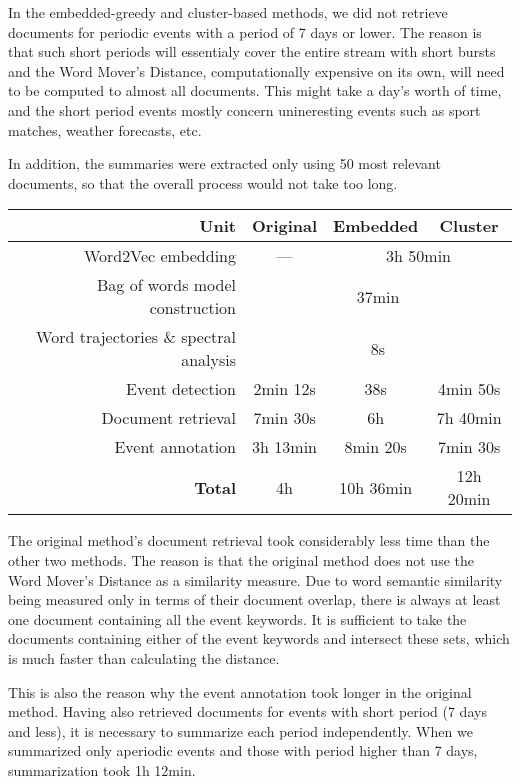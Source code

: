 In the embedded-greedy and cluster-based methods, we did not retrieve documents for periodic events with a period of 7 days or lower. The reason is that such short periods will essentialy cover the entire stream with short bursts and the Word Mover's Distance, computationally expensive on its own, will need to be computed to almost all documents. This might take a day's worth of time, and the short period events mostly concern unineresting events such as sport matches, weather forecasts, etc.

In addition, the summaries were extracted only using 50 most relevant documents, so that the overall process would not take too long.

\hspace{\fill}

\begin{minipage}{\linewidth}
\centering
\begin{tabular}{ r c c c }\toprule[1.5pt]
\bf Unit & \bf Original & \bf Embedded & \bf Cluster \\ \midrule
Word2Vec embedding & --- & \multicolumn{2}{c}{3h 50min} \\
Bag of words model construction & \multicolumn{3}{c}{37min} \\
Word trajectories \& spectral analysis & \multicolumn{3}{c}{8s} \\
Event detection & 2min 12s & 38s & 4min 50s \\
Document retrieval & 7min 30s & 6h & 7h 40min \\
Event annotation & 3h 13min & 8min 20s & 7min 30s \\ \midrule
\bf Total & 4h & 10h 36min & 12h 20min\\ \bottomrule[1.25pt]

\end{tabular}\par
{} \label{tab:title}
\end{minipage}

\hspace{\fill}

The original method's document retrieval took considerably less time than the other two methods. The reason is that the original method does not use the Word Mover's Distance as a similarity measure. Due to word semantic similarity being measured only in terms of their document overlap, there is always at least one document containing all the event keywords. It is sufficient to take the documents containing either of the event keywords and intersect these sets, which is much faster than calculating the distance.

This is also the reason why the event annotation took longer in the original method. Having also retrieved documents for events with short period (7 days and less), it is necessary to summarize each period independently. When we summarized only aperiodic events and those with period higher than 7 days, summarization took 1h 12min.

